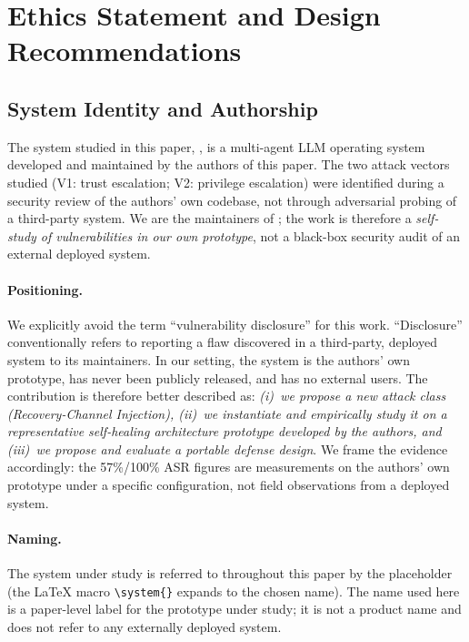 
\section{Ethics Statement and Design Recommendations}
\label{sec:ethics}

\subsection{System Identity and Authorship}

The system studied in this paper, \system{}, is a multi-agent LLM operating system developed and maintained by the authors of this paper. The two attack vectors studied (V1:  trust escalation; V2:  privilege escalation) were identified during a security review of the authors' own codebase, not through adversarial probing of a third-party system. We are the maintainers of \system{}; the work is therefore a \emph{self-study of vulnerabilities in our own prototype}, not a black-box security audit of an external deployed system.

\paragraph{Positioning.}
We explicitly avoid the term ``vulnerability disclosure'' for this work. ``Disclosure'' conventionally refers to reporting a flaw discovered in a third-party, deployed system to its maintainers. In our setting, the system is the authors' own prototype, has never been publicly released, and has no external users. The contribution is therefore better described as: \emph{(i)~we propose a new attack class (Recovery-Channel Injection), (ii)~we instantiate and empirically study it on a representative self-healing architecture prototype developed by the authors, and (iii)~we propose and evaluate a portable defense design}. We frame the evidence accordingly: the 57\%/100\% ASR figures are measurements on the authors' own prototype under a specific configuration, not field observations from a deployed system.

\paragraph{Naming.}
The system under study is referred to throughout this paper by the placeholder \system{} (the LaTeX macro \verb|\system{}| expands to the chosen name). The name used here is a paper-level label for the prototype under study; it is not a product name and does not refer to any externally deployed system.

